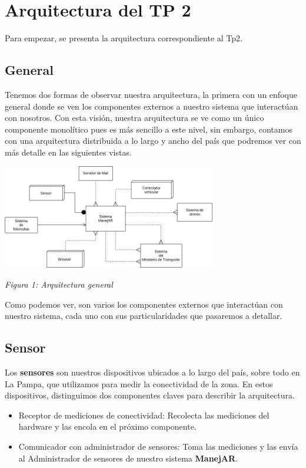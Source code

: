 \section{Arquitectura del TP 2}

Para empezar, se presenta la arquitectura correspondiente al Tp2.

\subsection{General}

Tenemos dos formas de observar nuestra arquitectura, la primera con un enfoque general donde se ven
los componentes externos a nuestro sistema que interactúan con nosotros. Con 
esta visión, nuestra arquitectura se ve como un único componente monolítico pues es más sencillo a
este nivel, sin embargo, contamos con una arquitectura distribuida a lo largo y ancho del país 
que podremos ver con más detalle en las siguientes vistas.

\begin{center}
  \includegraphics[width=0.7\textwidth]{./imagenes/arquitectura_tp2/general.png}
  \centerline{\textit{Figura 1: Arquitectura general}}
\end{center}


Como podemos ver, son varios los componentes externos que interactúan con 
nuestro sistema, cada uno con sus particularidades que pasaremos a detallar.

\subsection{Sensor}
Los \textbf{sensores} son nuestros dispositivos ubicados a lo largo del país, sobre todo en La 
Pampa, que utilizamos para medir la conectividad de la zona.
En estos dispositivos, distinguimos dos componentes claves para describir la 
arquitectura.

\begin{itemize}
  \item Receptor de mediciones de conectividad: Recolecta las mediciones del 
  hardware y las encola en el próximo componente.
  
  \item Comunicador con administrador de sensores: Toma las mediciones y las 
  envía al Administrador de sensores de nuestro sistema \textbf{ManejAR}.
\end{itemize}

